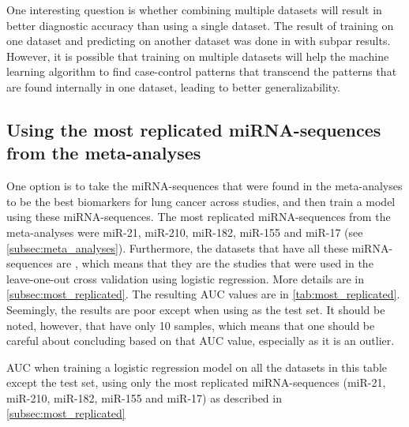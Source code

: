 {{{{{One interesting question is whether combining multiple datasets will result in better diagnostic accuracy than using a single dataset. The result of training on one dataset and predicting on another dataset was done in \citet{forprosjekt} with subpar results. However, it is possible that training on multiple datasets will help the machine learning algorithm to find case-control patterns that transcend the patterns that are found internally in one dataset, leading to better generalizability.

\subsection{Using the most replicated miRNA-sequences from the meta-analyses}
One option is to take the miRNA-sequences that were found in the meta-analyses to be the best biomarkers for lung cancer across studies, and then train a model using these miRNA-sequences. The most replicated miRNA-sequences from the meta-analyses were miR-21, miR-210, miR-182, miR-155 and miR-17 (see \autoref{subsec:meta_analyses}). Furthermore, the datasets that have all these miRNA-sequences are \citet{Asakura2020,Fehlmann2020,Leidinger2014,Patnaik2017,Yao2019}, which means that they are the studies that were used in the leave-one-out cross validation using logistic regression. More details are in \autoref{subsec:most_replicated}. The resulting AUC values are in \autoref{tab:most_replicated}. Seemingly, the results are poor except when using \citet{Yao2019} as the test set. It should be noted, however, that \citet{Yao2019} have only 10 samples, which means that one should be careful about concluding based on that AUC value, especially as it is an outlier.


\begin{table}
    \caption{AUC when training a logistic regression model on all the datasets in this table except the test set, using only the most replicated miRNA-sequences (miR-21, miR-210, miR-182, miR-155 and miR-17) as described in \autoref{subsec:most_replicated}}
    \label{tab:most_replicated}
    \begin{center}
    \end{center}
\end{table}

}}}}}
